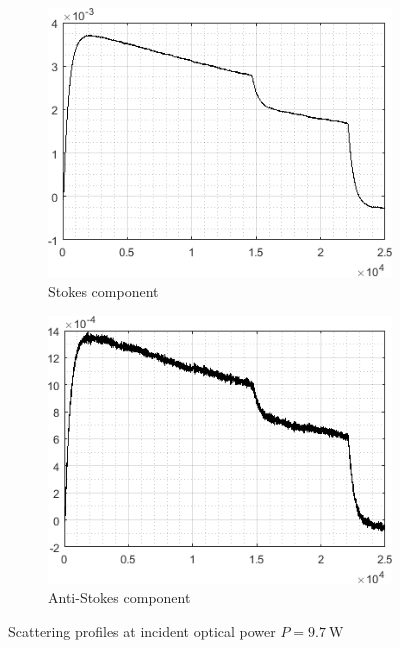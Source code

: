 \documentclass{standalone}
\begin{document}
\begin{figure}[h]
	\centering
	\begin{subfigure}[b]{0.49\textwidth}
		\includegraphics[width=\textwidth]{mmf_scatters_stokes.png}
		\caption{Stokes component}
	\end{subfigure}
	\begin{subfigure}[b]{0.49\textwidth}
		\includegraphics[width=\textwidth]{mmf_scatters_antistokes.png}
		\caption{Anti-Stokes component}
	\end{subfigure}
	\caption{Scattering profiles at incident optical power $P = \SI{9.7}{\watt}$}
	\label{fig:mmf_scatters}
\end{figure}
\end{document}
